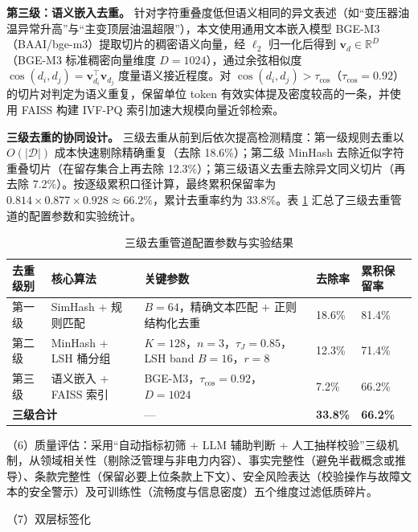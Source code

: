 \documentclass[fontset=fandol,type=master,campus=shenzhen,etitleauto=true]{hithesisbook}
\begin{document}
\textbf{第三级：语义嵌入去重。} 针对字符重叠度低但语义相同的异文表述（如``变压器油温异常升高''与``主变顶层油温超限''），本文使用通用文本嵌入模型 BGE-M3（BAAI/bge-m3）提取切片的稠密语义向量，经 $\ell_2$ 归一化后得到 $\mathbf{v}_d \in \mathbb{R}^{D}$（BGE-M3 标准稠密向量维度 $D = 1024$），通过余弦相似度 $\cos(d_i, d_j) = \mathbf{v}_{d_i}^{\top} \mathbf{v}_{d_j}$ 度量语义接近程度。对 $\cos(d_i, d_j) > \tau_{\cos}$（$\tau_{\cos} = 0.92$）的切片对判定为语义重复，保留单位 token 有效实体提及密度较高的一条，并使用 FAISS 构建 IVF-PQ 索引加速大规模向量近邻检索\cite{ref63}。

\textbf{三级去重的协同设计。} 三级去重从前到后依次提高检测精度：第一级规则去重以 $O(|\mathcal{D}|)$ 成本快速剔除精确重复（去除 18.6\%）；第二级 MinHash 去除近似字符重叠切片（在留存集合上再去除 12.3\%）；第三级语义去重去除异文同义切片（再去除 7.2\%）。按逐级累积口径计算，最终累积保留率为 $0.814 \times 0.877 \times 0.928 \approx 66.2\%$，累计去重率约为 33.8\%。表 \ref{tab:dedup-pipeline} 汇总了三级去重管道的配置参数和实验统计。

\begin{table}[htbp]
\centering
\caption{三级去重管道配置参数与实验结果}
\label{tab:dedup-pipeline}
\small
\setlength{\tabcolsep}{4pt}
\begin{tabular}{p{2.0cm}p{3.4cm}p{4.4cm}p{1.9cm}p{1.9cm}}
\toprule
\textbf{去重级别} & \textbf{核心算法} & \textbf{关键参数} & \textbf{去除率} & \textbf{累积保留率} \\
\midrule
第一级 & SimHash + 规则匹配 & $B = 64$，精确文本匹配 + 正则结构化去重 & 18.6\% & 81.4\% \\
\midrule
第二级 & MinHash + LSH 桶分组 & $K = 128$，$n = 3$，$\tau_J = 0.85$，LSH band $B = 16$，$r = 8$ & 12.3\% & 71.4\% \\
\midrule
第三级 & 语义嵌入 + FAISS 索引 & BGE-M3，$\tau_{\cos} = 0.92$，$D = 1024$ & 7.2\% & 66.2\% \\
\midrule
\multicolumn{2}{l}{\textbf{三级合计}} & --- & \textbf{33.8\%} & \textbf{66.2\%} \\
\bottomrule
\end{tabular}
\end{table}

\noindent （6）质量评估：采用``自动指标初筛 + LLM 辅助判断 + 人工抽样校验''三级机制，从领域相关性（剔除泛管理与非电力内容）、事实完整性（避免半截概念或推导）、条款完整性（保留必要上位条款上下文）、安全风险表达（校验操作与故障文本的安全警示）及可训练性（流畅度与信息密度）五个维度过滤低质碎片。

\noindent （7）双层标签化
\end{document}
